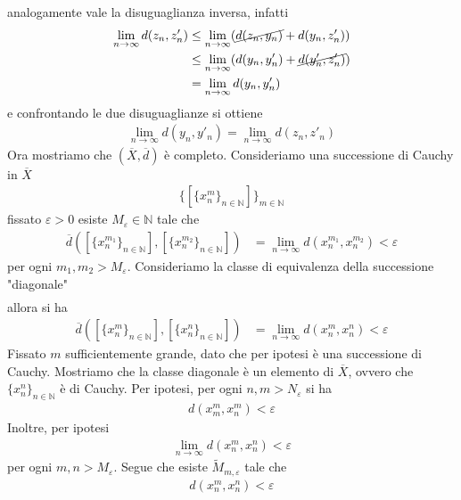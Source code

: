 \documentclass{article}
\numberwithin{equation}{subsection}
\begin{document}
analogamente vale la disuguaglianza inversa, infatti
\begin{align*}
    \lim_{n \rightarrow \infty}{d}(z_n, z'_n) &\leq \lim_{n \rightarrow \infty}(\cancel{{d}(z_n, y_n)} + {d}(y_n, z'_n))  \\
    &\leq \lim_{n \rightarrow \infty}({d}(y_n, y'_n) + \cancel{{d}(y'_n, z'_n)})  \\
    &= \lim_{n \rightarrow \infty}{d}(y_n, y'_n) 
\end{align*}
e confrontando le due disuguaglianze si ottiene 
\begin{align*}
    \lim_{n \rightarrow \infty}d(y_n, y'_n) = \lim_{n \rightarrow \infty}d(z_n, z'_n) 
\end{align*}
Ora mostriamo che $(\overline{X}, \overline{d})$ è completo. Consideriamo una successione di Cauchy in $\overline{X}$ 
\begin{align*}
    \{[\{x^m_n\}_{n \in \mathbb{N}}]\}_{m \in \mathbb{N}} 
\end{align*}
fissato $\varepsilon > 0$ esiste $M_\varepsilon \in \mathbb{N}$ tale che 
\begin{align*}
    \overline{d}([\{x^{m_1}_n\}_{n \in \mathbb{N}}], [\{x^{m_2}_n\}_{n \in \mathbb{N}}]) &= \lim_{n \rightarrow \infty}d(x^{m_1}_n, x^{m_2}_n) < \varepsilon 
\end{align*}
per ogni $m_1, m_2 > M_\varepsilon$. Consideriamo la classe di equivalenza della successione "diagonale" 
\begin{align*}
    [\{x^n_n\}_{n \in \mathbb{N}}] 
\end{align*}
allora si ha 
\begin{align*}
    \overline{d}([\{x^m_n\}_{n \in \mathbb{N}}], [\{x^n_n\}_{n \in \mathbb{N}}]) &= \lim_{n \rightarrow \infty}d(x^m_n, x^n_n) < \varepsilon
\end{align*}
Fissato $m$ sufficientemente grande, dato che per ipotesi è una successione di Cauchy. Mostriamo che la classe diagonale è un elemento di $\overline{X}$, ovvero che $\{x^n_n\}_{n \in \mathbb{N}}$ è di Cauchy. Per ipotesi, per ogni $n, m > N_\varepsilon$ si ha
\begin{align*}
    d(x^m_m, x^m_n) < \varepsilon
\end{align*}
Inoltre, per ipotesi
\begin{align*}
    \lim_{n \rightarrow \infty} d(x^m_n, x^n_n) < \varepsilon 
\end{align*}
per ogni $m, n > M_\varepsilon$. Segue che esiste $\widetilde{M}_{m, \varepsilon}$ tale che
\begin{align*}
    d(x^m_n, x^n_n) < \varepsilon
\end{align*}
\end{document}
